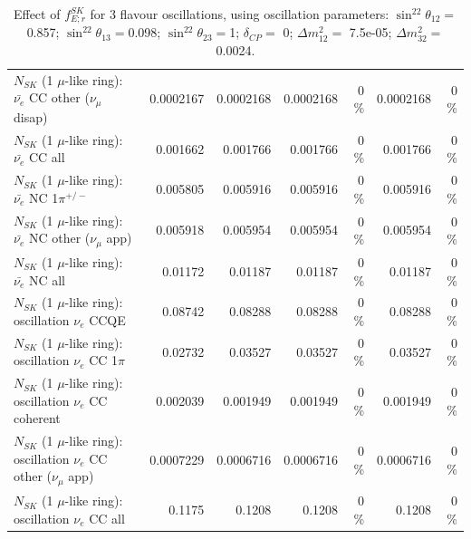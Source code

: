\begin{table}
\begin{tabular}{| l | r | r | r  r | r  r |}
          $N_{SK}$ (1 $\mu$-like ring): $\bar{\nu_e}$ CC other ($\nu_\mu$ disap) &       0.0002167 &       0.0002168 &       0.0002168 &        0 \%  &       0.0002168 &        0 \%  \\ 
                            $N_{SK}$ (1 $\mu$-like ring): $\bar{\nu_{e}}$ CC all &        0.001662 &        0.001766 &        0.001766 &        0 \%  &        0.001766 &        0 \%  \\ 
\hline
                     $N_{SK}$ (1 $\mu$-like ring): $\bar{\nu_e}$ NC 1$\pi^{+/-}$ &        0.005805 &        0.005916 &        0.005916 &        0 \%  &        0.005916 &        0 \%  \\ 
            $N_{SK}$ (1 $\mu$-like ring): $\bar{\nu_e}$ NC other ($\nu_\mu$ app) &        0.005918 &        0.005954 &        0.005954 &        0 \%  &        0.005954 &        0 \%  \\ 
                            $N_{SK}$ (1 $\mu$-like ring): $\bar{\nu_{e}}$ NC all &         0.01172 &         0.01187 &         0.01187 &        0 \%  &         0.01187 &        0 \%  \\ 
\hline
\hline
\hline
                          $N_{SK}$ (1 $\mu$-like ring): oscillation $\nu_e$ CCQE &         0.08742 &         0.08288 &         0.08288 &        0 \%  &         0.08288 &        0 \%  \\ 
                     $N_{SK}$ (1 $\mu$-like ring): oscillation $\nu_e$ CC 1$\pi$ &         0.02732 &         0.03527 &         0.03527 &        0 \%  &         0.03527 &        0 \%  \\ 
                   $N_{SK}$ (1 $\mu$-like ring): oscillation $\nu_e$ CC coherent &        0.002039 &        0.001949 &        0.001949 &        0 \%  &        0.001949 &        0 \%  \\ 
      $N_{SK}$ (1 $\mu$-like ring): oscillation $\nu_e$ CC other ($\nu_\mu$ app) &       0.0007229 &       0.0006716 &       0.0006716 &        0 \%  &       0.0006716 &        0 \%  \\ 
                       $N_{SK}$ (1 $\mu$-like ring): oscillation $\nu_e$  CC all &          0.1175 &          0.1208 &          0.1208 &        0 \%  &          0.1208 &        0 \%  \\ 
\hline
\hline
\end{tabular}
\caption{ Effect of $f_{E; r}^{SK}$   for 3 flavour oscillations, using oscillation parameters:  $\sin^22\theta_{12} = $0.857; $\sin^22\theta_{13} = $0.098; $\sin^22\theta_{23} = $1; $\delta_{CP} = $        0; $\Delta m^2_{12} = $    7.5e-05; $\Delta m^2_{32} = $    0.0024. }
\label{tab:num_sk_energy_scale_1RmuT_3f_osc_t13:0.098_spectralreco_spectraltrue}
\end{table}
